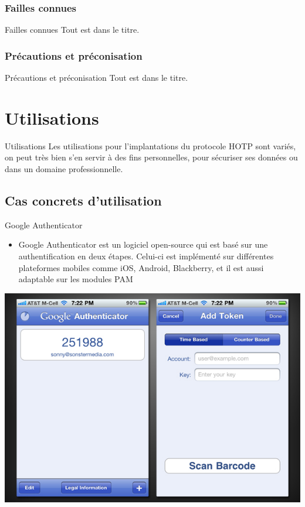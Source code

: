 \documentclass{beamer}
\begin{document}
    
    \subsubsection{Failles connues}
    \begin{frame}{Failles connues}
        Tout est dans le titre.
    \end{frame}

    
    \subsubsection{Pr\'ecautions et pr\'econisation}
    \begin{frame}{Pr\'ecautions et pr\'econisation}
        Tout est dans le titre.
    \end{frame}
    
\section{Utilisations}
\begin{frame}{Utilisations}
Les utilisations pour l'implantations du protocole HOTP sont vari\'{e}s, on peut tr\`es bien s'en servir \`{a} des fins personnelles, pour s\'{e}curiser ses donn\'{e}es ou dans un domaine professionnelle.
\end{frame}

  \subsection{Cas concrets d'utilisation}
\begin{frame}{Google Authenticator}
	 \begin{itemize}
    \item Google Authenticator est un logiciel open-source qui est bas\'{e} sur une authentification en deux 		\'{e}tapes. Celui-ci est impl\'{e}ment\'{e} sur diff\'{e}rentes plateformes mobiles comme iOS, Android, 		Blackberry, et il est aussi adaptable sur les modules PAM
  \end{itemize}
  \includegraphics[scale=0.5]{imgHOTP/GoogleAuthenticator_2.jpg}
\end{frame}
\end{document}

